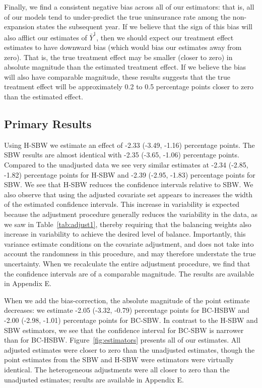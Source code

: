 Finally, we find a consistent negative bias across all of our estimators: that is, all of our models tend to under-predict the true uninsurance rate among the non-expansion states the subsequent year. If we believe that the sign of this bias will also afflict our estimates of $\bar{Y}^1$, then we should expect our treatment effect estimates to have downward bias (which would bias our estimates away from zero). That is, the true treatment effect may be smaller (closer to zero) in absolute magnitude than the estimated treatment effect. If we believe the bias will also have comparable magnitude, these results suggests that the true treatment effect will be approximately 0.2 to 0.5 percentage points closer to zero than the estimated effect.

\subsection{Primary Results}

Using H-SBW we estimate an effect of -2.33 (-3.49, -1.16) percentage points. The SBW results are almost identical with -2.35 (-3.65, -1.06) percentage points. Compared to the unadjusted data we see very similar estimates at -2.34 (-2.85, -1.82) percentage points for H-SBW and -2.39 (-2.95, -1.83) percentage points for SBW. We see that H-SBW reduces the confidence intervals relative to SBW. We also observe that using the adjusted covariate set appears to increases the width of the estimated confidence intervals. This increase in variability is expected because the adjustment procedure generally reduces the variability in the data, as we saw in Table~\ref{tab:adjust1}, thereby requiring that the balancing weights also increase in variability to achieve the desired level of balance. Importantly, this variance estimate conditions on the covariate adjustment, and does not take into account the randomness in this procedure, and may therefore understate the true uncertainty. When we recalculate the entire adjustment procedure, we find that the confidence intervals are of a comparable magnitude. The results are available in Appendix E.

When we add the bias-correction, the absolute magnitude of the point estimate decreases: we estimate -2.05 (-3.32, -0.79) percentage points for BC-HSBW and -2.00 (-2.98, -1.01) percentage points for BC-SBW. In contrast to the H-SBW and SBW estimators, we see that the confidence interval for BC-SBW is narrower than for BC-HSBW. Figure~\ref{fig:estimators} presents all of our estimates. All adjusted estimates were closer to zero than the unadjusted estimates, though the point estimates from the SBW and H-SBW were estimators were virtually identical. The heterogeneous adjustments were all closer to zero than the unadjusted estimates; results are available in Appendix E.

